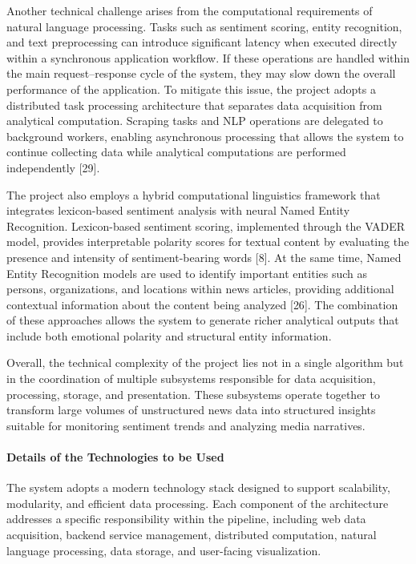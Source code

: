 Another technical challenge arises from the computational requirements of natural language processing. Tasks such as sentiment scoring, entity recognition, and text preprocessing can introduce significant latency when executed directly within a synchronous application workflow. If these operations are handled within the main request--response cycle of the system, they may slow down the overall performance of the application. To mitigate this issue, the project adopts a distributed task processing architecture that separates data acquisition from analytical computation. Scraping tasks and NLP operations are delegated to background workers, enabling asynchronous processing that allows the system to continue collecting data while analytical computations are performed independently {[}29{]}.

The project also employs a hybrid computational linguistics framework that integrates lexicon-based sentiment analysis with neural Named Entity Recognition. Lexicon-based sentiment scoring, implemented through the VADER model, provides interpretable polarity scores for textual content by evaluating the presence and intensity of sentiment-bearing words {[}8{]}. At the same time, Named Entity Recognition models are used to identify important entities such as persons, organizations, and locations within news articles, providing additional contextual information about the content being analyzed {[}26{]}. The combination of these approaches allows the system to generate richer analytical outputs that include both emotional polarity and structural entity information.

Overall, the technical complexity of the project lies not in a single algorithm but in the coordination of multiple subsystems responsible for data acquisition, processing, storage, and presentation. These subsystems operate together to transform large volumes of unstructured news data into structured insights suitable for monitoring sentiment trends and analyzing media narratives.

\paragraph{\texorpdfstring{\textbf{Details of the Technologies to be Used}}{Details of the Technologies to be Used}}\label{details-of-the-technologies-to-be-used}

The system adopts a modern technology stack designed to support scalability, modularity, and efficient data processing. Each component of the architecture addresses a specific responsibility within the pipeline, including web data acquisition, backend service management, distributed computation, natural language processing, data storage, and user-facing visualization.

